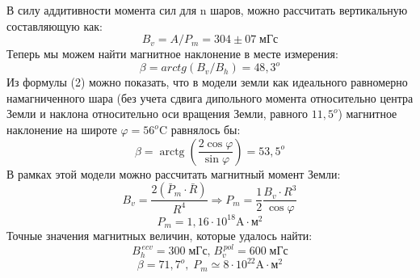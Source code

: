 \documentclass[a4paper, 12pt]{article}
\begin{document}
В силу аддитивности момента сил для n шаров, можно рассчитать вертикальную составляющую как:
\begin{displaymath}B_{v}=A / P_{m} = 304 \pm 07 \; \text{мГс}\end{displaymath}
Теперь мы можем найти магнитное наклонение в месте измерения:
\begin{displaymath} \beta = arctg(B_{v} / B_{h}) = 48,3^{o}\end{displaymath}
Из формулы (2) можно показать, что в модели земли как идеального равномерно намагниченного шара (без учета сдвига дипольного момента относительно центра Земли и наклона относительно оси вращения Земли, равного $11,5^{o}$)  магнитное наклонение на широте $\varphi = 56^{o}$C равнялось бы:
\begin{displaymath} \beta=\operatorname{arctg}\left(\frac{2 \cos \varphi}{\sin \varphi}\right) = 53,5^{o} \end{displaymath}
В рамках этой модели можно рассчитать магнитный момент Земли:
    \begin{equation}
    B_{v}=\frac{2\left(\bar{P}_{m} \cdot \bar{R}\right)}{R^{4}} \Rightarrow P_{m}=\frac{1}{2} \frac{B_{v} \cdot R^{3}}{\cos \varphi} \end{equation}
    \begin{displaymath} P_{m}= 1,16 \cdot 10^{18} \text{A} \cdot \text{м}^{2}\end{displaymath}
    Точные значения магнитных величин, которые удалось найти:
    \begin{displaymath} B_{h}^{\, ecv}= 300\; \text{мГс,} \;  B_{v}^{\, pol}= 600 \; \text{мГс}\end{displaymath}
    \begin{displaymath} \beta = 71,7^{o}, \; P_{m} \simeq 8 \cdot 10^{22} \text{A} \cdot \text{м}^{2}  \end{displaymath}
    



 
\end{document}
